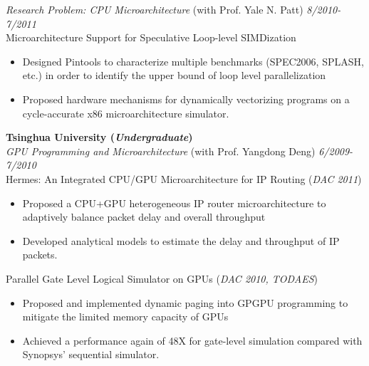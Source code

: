 \documentclass[margin, 9pt]{res} %
\begin{document}
\begin{resume}
\medskip
{\large\textit{Research Problem: CPU Microarchitecture} (with Prof. Yale N. Patt)} \hfill\textit{8/2010-7/2011}\\

\vspace*{-7pt}
Microarchitecture Support for Speculative Loop-level SIMDization\\
\vspace*{-10pt}
\begin{itemize}[leftmargin=*] \itemsep -3pt
\vspace*{-5pt}
	\item Designed Pintools to characterize multiple benchmarks (SPEC2006, SPLASH, etc.) in order to identify the upper bound of loop level parallelization
	\item Proposed hardware mechanisms for dynamically vectorizing programs on a cycle-accurate x86 microarchitecture simulator.
\end{itemize}

\bigskip
{\large\textbf{Tsinghua University (\textit{Undergraduate})}}\\

\vspace*{-7pt}
{\large\textit{GPU Programming and Microarchitecture} (with Prof. Yangdong Deng)} \hfill\textit{6/2009-7/2010}\\

\vspace*{-7pt}
Hermes: An Integrated CPU/GPU Microarchitecture for IP Routing \hfill(\textit{DAC 2011})\\
\vspace*{-10pt}
\begin{itemize}[leftmargin=*] \itemsep -3pt
\vspace*{-5pt}
	\item Proposed a CPU+GPU heterogeneous IP router microarchitecture to adaptively balance packet delay and overall throughput
	\item Developed analytical models to estimate the delay and throughput of IP packets.
\end{itemize}

\medskip
Parallel Gate Level Logical Simulator on GPUs \hfill(\textit{DAC 2010, TODAES})\\
\vspace*{-10pt}
\begin{itemize}[leftmargin=*] \itemsep -3pt
\vspace*{-5pt}
	\item Proposed and implemented dynamic paging into GPGPU programming to mitigate the limited memory capacity of GPUs
	\item Achieved a performance again of 48X for gate-level simulation compared with Synopsys' sequential simulator.
\end{itemize}


\end{resume}
\end{document}
